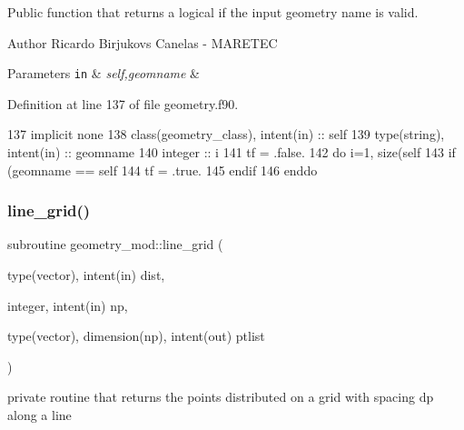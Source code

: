 Public function that returns a logical if the input geometry name is valid. 

\begin{DoxyAuthor}{Author}
Ricardo Birjukovs Canelas -\/ M\+A\+R\+E\+T\+EC 
\end{DoxyAuthor}

\begin{DoxyParams}[1]{Parameters}
\mbox{\tt in}  & {\em self,geomname} & \\
\hline
\end{DoxyParams}


Definition at line 137 of file geometry.\+f90.


\begin{DoxyCode}
137     \textcolor{keywordtype}{implicit none}
138     \textcolor{keywordtype}{class}(geometry\_class), \textcolor{keywordtype}{intent(in)} :: self
139     \textcolor{keywordtype}{type}(string), \textcolor{keywordtype}{intent(in)} :: geomname
140     \textcolor{keywordtype}{integer} :: i
141     tf = .false.
142     \textcolor{keywordflow}{do} i=1, \textcolor{keyword}{size}(self%
143         \textcolor{keywordflow}{if} (geomname == self%
144             tf = .true.
145 \textcolor{keywordflow}{        endif}
146 \textcolor{keywordflow}{    enddo}
\end{DoxyCode}
\mbox{\label{namespacegeometry__mod_a48e38bde8ea77f5e1bb42d3fa2c85037}} 
\subsubsection{\texorpdfstring{line\+\_\+grid()}{line\_grid()}}
{\footnotesize\ttfamily subroutine geometry\+\_\+mod\+::line\+\_\+grid (\begin{DoxyParamCaption}\item[{type(vector), intent(in)}]{dist,  }\item[{integer, intent(in)}]{np,  }\item[{type(vector), dimension(np), intent(out)}]{ptlist }\end{DoxyParamCaption})\hspace{0.3cm}{\ttfamily [private]}}



private routine that returns the points distributed on a grid with spacing dp along a line 

